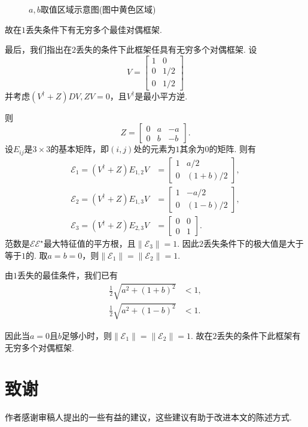 \documentclass[cn,11pt,a4paper,founder]{elegantpaper}
\newcommand{\calE}{\mathcal{E}}
\begin{document}
\begin{example}[具有无穷个最佳对偶框架的例子]
\begin{figure}[h]
  \caption{\(a,b\)取值区域示意图(图中黄色区域)}
  \label{fig:3.2}
\end{figure}

故在\(1\)丢失条件下有无穷多个最佳对偶框架.

最后，我们指出在\(2\)丢失的条件下此框架任具有无穷多个对偶框架. 设
\[
	V=\begin{bmatrix}
	1&0\\
	0&1/2\\
	0&1/2
	\end{bmatrix}
\]
并考虑\((V^{\dagger}+Z)DV,ZV=0\)，且\(V^{\dagger}\)是最小平方逆.

则
\[
	Z=\begin{bmatrix}
	0&a&-a\\
	0&b&-b
	\end{bmatrix}.
\]
设\(E_{ij}\)是\(3\times 3\)的基本矩阵，即\((i,j)\)处的元素为\(1\)其余为\(0\)的矩阵. 则有
\begin{align*}
\calE_1=(V^{\dagger}+Z)E_{1,2}V&=\begin{bmatrix}
1&a/2\\
0&(1+b)/2
\end{bmatrix},\\
\calE_2=(V^{\dagger}+Z)E_{1,3}V&=\begin{bmatrix}
1&-a/2\\
0&(1-b)/2
\end{bmatrix},\\
\calE_3=(V^{\dagger}+Z)E_{2,3}V&=\begin{bmatrix}
0&0\\
0&1
\end{bmatrix}.
\end{align*}
范数是\(\calE\calE^{\star}\)最大特征值的平方根，且\(\|\calE_3\|=1\). 因此\(2\)丢失条件下的极大值是大于等于\(1\)的. 取\(a=b=0\)，则\(\|\calE_1\|=\|\calE_2\|=1\).

由\(1\)丢失的最佳条件，我们已有
\begin{align*}
\frac{1}{2}\sqrt{a^2+(1+b)^2}&<1,\\[2pt]
\frac{1}{2}\sqrt{a^2+(1-b)^2}&<1.
\end{align*}

因此当\(a=0\)且\(b\)足够小时，则\(\|\calE_1\|=\|\calE_2\|=1\). 故在\(2\)丢失的条件下此框架有无穷多个对偶框架.
\end{example}

\newpage
\section*{致谢}
作者感谢审稿人提出的一些有益的建议，这些建议有助于改进本文的陈述方式.

\nocite{*}

\end{document}
